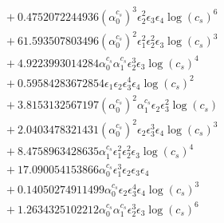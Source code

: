 \documentclass[10pt]{article}
\begin{document}
\begin{align*}
&{}  + 0.4752072244936 \left(\alpha_{0}^{c_s}\right)^{3} \epsilon_{2}^{2} \epsilon_{3} \epsilon_{4} \log{\left(c_{s} \right)}^{6} \\
&{}  + 61.593507803496 \left(\alpha_{0}^{c_s}\right)^{2} \epsilon_{1}^{2} \epsilon_{2}^{2} \epsilon_{3} \log{\left(c_{s} \right)}^{3} \\
&{}  + 4.9223993014284 \alpha_{0}^{c_s} \alpha_{1}^{c_s} \epsilon_{2}^{3} \epsilon_{3} \log{\left(c_{s} \right)}^{4} \\
&{}  + 0.59584283672854 \epsilon_{1} \epsilon_{2} \epsilon_{3}^{4} \epsilon_{4} \log{\left(c_{s} \right)}^{2} \\
&{}  + 3.8153132567197 \left(\alpha_{0}^{c_s}\right)^{2} \alpha_{1}^{c_s} \epsilon_{2} \epsilon_{3}^{2} \log{\left(c_{s} \right)} \\
&{}  + 2.0403478321431 \left(\alpha_{0}^{c_s}\right)^{2} \epsilon_{2} \epsilon_{3}^{3} \epsilon_{4} \log{\left(c_{s} \right)}^{3} \\
&{}  + 8.4758963428635 \alpha_{1}^{c_s} \epsilon_{1}^{2} \epsilon_{2}^{2} \epsilon_{3} \log{\left(c_{s} \right)}^{4} \\
&{}  + 17.090054153866 \alpha_{0}^{c_s} \epsilon_{1}^{3} \epsilon_{2} \epsilon_{3} \epsilon_{4} \\
&{}  + 0.14050274911499 \alpha_{0}^{c_s} \epsilon_{2} \epsilon_{3}^{4} \epsilon_{4} \log{\left(c_{s} \right)}^{3} \\
&{}  + 1.2634325102212 \alpha_{0}^{c_s} \alpha_{1}^{c_s} \epsilon_{2}^{3} \epsilon_{3} \log{\left(c_{s} \right)}^{6}
\end{align*}
\end{document}

